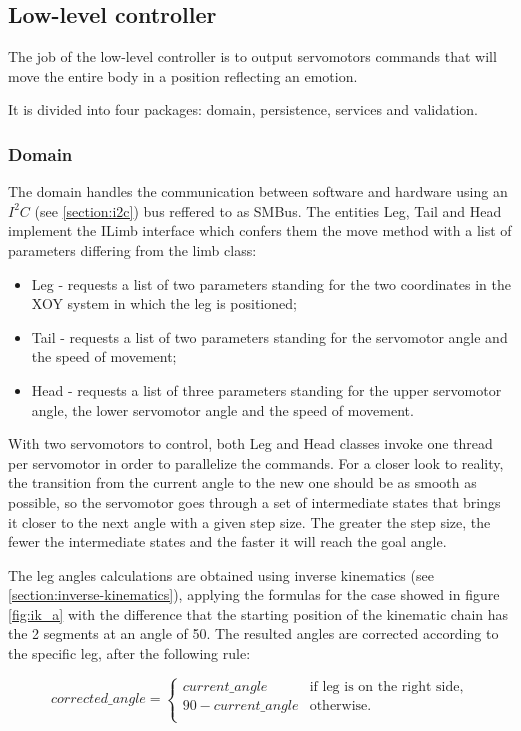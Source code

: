 \documentclass[runningheads,a4paper,12pt]{report}
\begin{document}
\subsection*{Low-level controller}
The job of the low-level controller is to output servomotors commands that will move the entire body in a position reflecting an emotion.

It is divided into four packages: domain, persistence, services and validation. 

\subsubsection{Domain}
The domain handles the communication between software and hardware using an $I^2C$ (see \ref{section:i2c}) bus reffered to as SMBus. The entities Leg, Tail and Head implement the ILimb interface which confers them the move method with a list of parameters differing from the limb class:
\begin{itemize}
\item Leg - requests a list of two parameters standing for the two coordinates in the XOY system in which the leg is positioned;
\item Tail - requests a list of two parameters standing for the servomotor angle and the speed of movement;
\item Head - requests a list of three parameters standing for the upper servomotor angle, the lower servomotor angle and the speed of movement.
\end{itemize}

With two servomotors to control, both Leg and Head classes invoke one thread per servomotor in order to parallelize the commands. For a closer look to reality, the transition from the current angle to the new one should be as smooth as possible, so the servomotor goes through a set of intermediate states that brings it closer to the next angle with a given step size. The greater the step size, the fewer the intermediate states  and the faster it will reach the goal angle. 

The leg angles calculations are obtained using inverse kinematics (see \ref{section:inverse-kinematics}), applying the formulas for the case showed in figure \ref{fig:ik_a} with the difference that the starting position of the kinematic chain has the 2 segments at an angle of 50\textdegree. The resulted angles are corrected according to the specific leg, after the following rule:

\begin{equation*}
    corrected\_angle = \begin{cases}
               current\_angle  & \text{if leg is on the right side,}\\
               90 - current\_angle  & \text{otherwise.}\\
               \end{cases}
\end{equation*}
\end{document}
